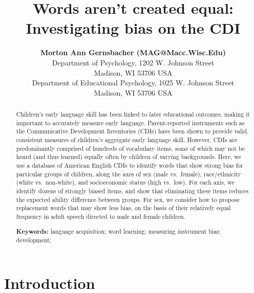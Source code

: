 \documentclass[10pt, letterpaper]{article}
\title{Words aren't created equal: Investigating bias on the CDI}
\author{{\large \bf Morton Ann Gernsbacher (MAG@Macc.Wisc.Edu)} \\ Department of Psychology, 1202 W. Johnson Street \\ Madison, WI 53706 USA \AND {\large \bf Sharon J.~Derry (SDJ@Macc.Wisc.Edu)} \\ Department of Educational Psychology, 1025 W. Johnson Street \\ Madison, WI 53706 USA}
\begin{document}
\maketitle

\begin{abstract}
Children's early language skill has been linked to later educational
outcomes, making it important to accurately measure early language.
Parent-reported instruments such as the Communicative Development
Inventories (CDIs) have been shown to provide valid, consistent measures
of children's aggregate early language skill. However, CDIs are
predominantly comprised of hundreds of vocabulary items, some of which
may not be heard (and thus learned) equally often by children of varying
backgrounds. Here, we use a database of American English CDIs to
identify words that show strong bias for particular groups of children,
along the axes of sex (male vs.~female), race/ethnicity (white
vs.~non-white), and socioeconomic status (high vs.~low). For each axis,
we identify dozens of strongly biased items, and show that eliminating
these items reduces the expected ability difference between groups. For
sex, we consider how to propose replacement words that may show less
bias, on the basis of their relatively equal frequency in adult speech
directed to male and female children.

\textbf{Keywords:}
language acquisition; word learning; measuring instrument bias;
development;
\end{abstract}

\hypertarget{introduction}{%
\section{Introduction}\label{introduction}}
\end{document}

